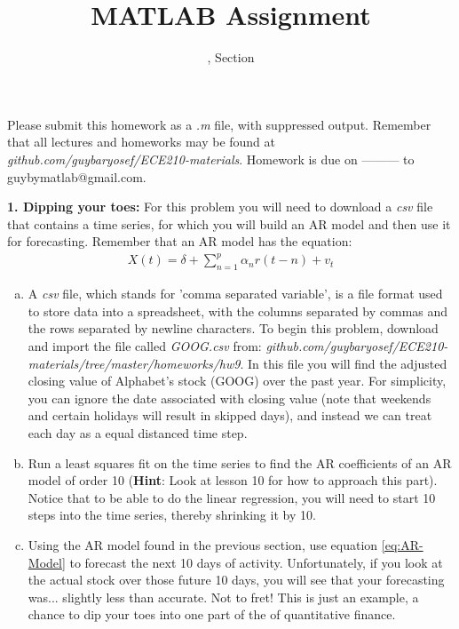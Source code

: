 \documentclass[11pt]{article}
\title{MATLAB Assignment \Homework}
\author{\Session, Section \Section}
\date{}
\makeatletter
\def\MyEmail{guybymatlab@gmail.com}
\def\DateOfSubmission{ --------- }
\makeatother
\begin{document}
\maketitle
Please submit this homework as a \textit{.m} file, 
with suppressed output.
Remember that all lectures and homeworks may be found at 
\textit{github.com/guybaryosef/ECE210-materials}.
Homework is due on \DateOfSubmission to \MyEmail.

\noindent
\newline
\textbf{1. Dipping your toes:}
For this problem you will need to download a \textit{csv} file that
contains a time series, for which you will build an AR model and then
use it for forecasting. Remember that an AR model has the equation:
\begin{eqnarray}\label{eq:AR-Model}
    X(t) = \delta + \sum_{n = 1}^{p}\alpha_nr(t-n) + v_t
\end{eqnarray}

\begin{enumerate}[a.]
    \item A \textit{csv} file, which stands for 'comma separated variable',
    is a file format used to store data into a spreadsheet, 
    with the columns separated by commas and the rows separated by 
    newline characters.
    To begin this problem, download and import the file called \textit{GOOG.csv}
    from:
    \textit{github.com/guybaryosef/ECE210-materials/tree/master/homeworks/hw9}.
    In this file you will find the adjusted closing value of Alphabet's stock
    (GOOG) over the past year.
    For simplicity, you can ignore the date associated with closing value
    (note that weekends and certain holidays will result in skipped days),
    and instead we can treat each day as a equal distanced time step.

    \item Run a least squares fit on the time series to find the AR
    coefficients of an AR model of order 10 (\textbf{Hint}: Look at lesson
    10 for how to approach this part).
    Notice that to be able to do the linear regression, you will need to
    start 10 steps into the time series,
    thereby shrinking it by 10. 

    \item Using the AR model found in the previous section, use equation
    \eqref{eq:AR-Model} to forecast the next 10 days of activity.
    Unfortunately, if you look at the actual stock over those future 10 days,
    you will see that your forecasting was... slightly less than accurate. 
    Not to fret!
    This is just an example, a chance to dip your toes into one part of the
    of quantitative finance.
\end{enumerate}
\end{document}
